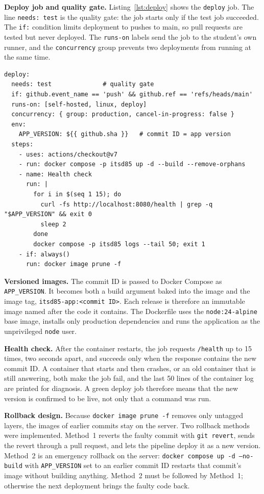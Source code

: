 \documentclass[conference]{IEEEtran}
\begin{document}
\textbf{Deploy job and quality gate.} Listing~\ref{lst:deploy} shows the \texttt{deploy} job. The line \texttt{needs: test} is the quality gate: the job starts only if the test job succeeded. The \texttt{if:} condition limits deployment to pushes to main, so pull requests are tested but never deployed. The \texttt{runs-on} labels send the job to the student's own runner, and the \texttt{concurrency} group prevents two deployments from running at the same time.

\begin{lstlisting}[caption={Deploy job of the workflow (health-check loop shortened).},label={lst:deploy},float=t]
deploy:
  needs: test              # quality gate
  if: github.event_name == 'push' && github.ref == 'refs/heads/main'
  runs-on: [self-hosted, linux, deploy]
  concurrency: { group: production, cancel-in-progress: false }
  env:
    APP_VERSION: ${{ github.sha }}   # commit ID = app version
  steps:
    - uses: actions/checkout@v7
    - run: docker compose -p itsd85 up -d --build --remove-orphans
    - name: Health check
      run: |
        for i in $(seq 1 15); do
          curl -fs http://localhost:8080/health | grep -q "$APP_VERSION" && exit 0
          sleep 2
        done
        docker compose -p itsd85 logs --tail 50; exit 1
    - if: always()
      run: docker image prune -f
\end{lstlisting}

\textbf{Versioned images.} The commit ID is passed to Docker Compose as \texttt{APP\_VERSION}. It becomes both a build argument baked into the image and the image tag, \texttt{itsd85-app:<commit ID>}. Each release is therefore an immutable image named after the code it contains. The Dockerfile uses the \texttt{node:24-alpine} base image, installs only production dependencies and runs the application as the unprivileged \texttt{node} user.

\textbf{Health check.} After the container restarts, the job requests \texttt{/health} up to 15 times, two seconds apart, and succeeds only when the response contains the new commit ID. A container that starts and then crashes, or an old container that is still answering, both make the job fail, and the last 50 lines of the container log are printed for diagnosis. A green deploy job therefore means that the new version is confirmed to be live, not only that a command was run.

\textbf{Rollback design.} Because \texttt{docker image prune -f} removes only untagged layers, the images of earlier commits stay on the server. Two rollback methods were implemented. Method~1 reverts the faulty commit with \texttt{git revert}, sends the revert through a pull request, and lets the pipeline deploy it as a new version. Method~2 is an emergency rollback on the server: \texttt{docker compose up -d --no-build} with \texttt{APP\_VERSION} set to an earlier commit ID restarts that commit's image without building anything. Method~2 must be followed by Method~1; otherwise the next deployment brings the faulty code back.
\end{document}
